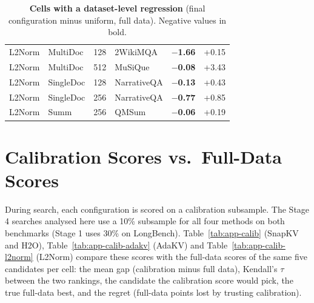 \begin{table}[t]
\begin{tabular}{@{}l l r l r r@{}}
    L2Norm & MultiDoc & 128 & 2WikiMQA & \textbf{$-$1.66} & +0.15 \\
    L2Norm & MultiDoc & 512 & MuSiQue & \textbf{$-$0.08} & +3.43 \\
    L2Norm & SingleDoc & 128 & NarrativeQA & \textbf{$-$0.13} & +0.43 \\
    L2Norm & SingleDoc & 256 & NarrativeQA & \textbf{$-$0.77} & +0.85 \\
    L2Norm & Summ & 256 & QMSum & \textbf{$-$0.06} & +0.19 \\
    \bottomrule
  \end{tabular}
  \caption{\textbf{Cells with a dataset-level regression} (final configuration minus uniform, full data). Negative values in bold.}
  \label{tab:app-dataset-reg}
\end{table}


\section{Calibration Scores vs.\ Full-Data Scores}
\label{app:calib}

During search, each configuration is scored on a calibration subsample. The Stage 4 searches analysed here use a 10\% subsample for all four methods on both benchmarks (Stage 1 uses 30\% on LongBench). Table~\ref{tab:app-calib} (SnapKV and H2O), Table~\ref{tab:app-calib-adakv} (AdaKV) and Table~\ref{tab:app-calib-l2norm} (L2Norm) compare these scores with the full-data scores of the same five candidates per cell: the mean gap (calibration minus full data), Kendall's $\tau$ between the two rankings, the candidate the calibration score would pick, the true full-data best, and the regret (full-data points lost by trusting calibration).

